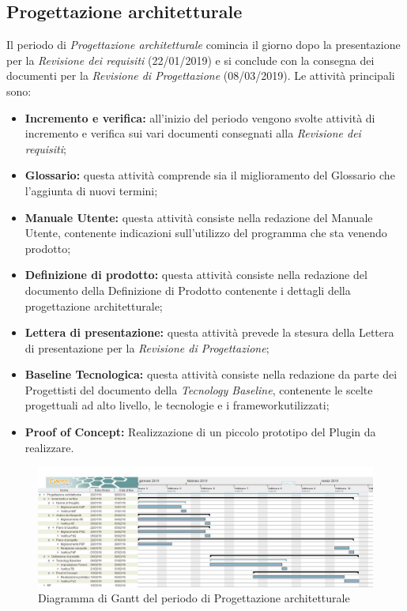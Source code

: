 \newpage
\subsection{Progettazione architetturale}
Il periodo di \textit{Progettazione architetturale} comincia il giorno dopo la presentazione per la \textit{Revisione dei requisiti} (22/01/2019) e si conclude con la consegna dei documenti per la \textit{Revisione di Progettazione} (08/03/2019). Le attività principali sono:
\begin{itemize}
	\item\textbf{Incremento e verifica:} all'inizio del periodo vengono svolte attività di incremento e verifica sui vari documenti consegnati alla \textit{Revisione dei requisiti};
	\item\textbf{Glossario:} questa attività comprende sia il miglioramento del Glossario che l’aggiunta di nuovi termini;
	\item\textbf{Manuale Utente:}  questa attività consiste nella redazione del Manuale Utente, contenente indicazioni sull’utilizzo del programma che sta venendo prodotto;
	\item\textbf{Definizione di prodotto:} questa attività consiste nella redazione del documento della Definizione di Prodotto contenente i dettagli della progettazione architetturale;
	\item\textbf{Lettera di presentazione:} questa attività prevede la stesura della Lettera di presentazione per la \textit{Revisione di Progettazione};
	\item\textbf{Baseline Tecnologica:} questa attività consiste nella redazione da parte dei Progettisti del documento della \textit{Tecnology Baseline}\pedice, contenente le scelte progettuali ad alto livello, le tecnologie e i framework\pedice utilizzati;
	\item \textbf{Proof of Concept:} Realizzazione di un piccolo prototipo del Plugin da realizzare.
\end{itemize}

\begin{figure}[!htpb]
	\centering
	\includegraphics[width=\textwidth]{Gantt_seconda_fase.jpg}
	\caption{Diagramma di Gantt del periodo di Progettazione architetturale}
\end{figure}

